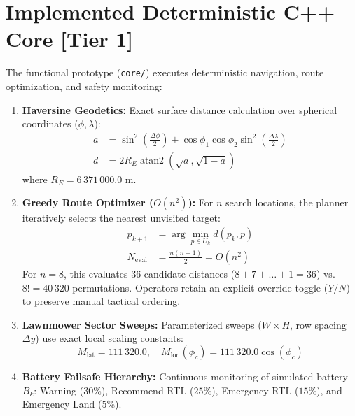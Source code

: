 \documentclass[conference]{IEEEtran}
\begin{document}
\section{Implemented Deterministic C++ Core [Tier 1]}
The functional prototype (\texttt{core/}) executes deterministic navigation, route optimization, and safety monitoring:
\begin{enumerate}
    \item \textbf{Haversine Geodetics:} Exact surface distance calculation over spherical coordinates ($\phi, \lambda$):
    \begin{align}
    a &= \sin^2\left(\frac{\Delta\phi}{2}\right) + \cos\phi_1\cos\phi_2\sin^2\left(\frac{\Delta\lambda}{2}\right) \\
    d &= 2 R_E \operatorname{atan2}\left(\sqrt{a}, \sqrt{1-a}\right)
    \end{align}
    where $R_E = 6\,371\,000.0\text{ m}$.
    
    \item \textbf{Greedy Route Optimizer ($O(n^2)$):} For $n$ search locations, the planner iteratively selects the nearest unvisited target:
    \begin{align}
    p_{k+1} &= \arg\min_{p \in U_k} d(p_k, p) \\
    N_{\mathrm{eval}} &= \frac{n(n+1)}{2} = O(n^2)
    \end{align}
    For $n=8$, this evaluates 36 candidate distances ($8+7+\dots+1=36$) vs.\ $8! = 40\,320$ permutations. Operators retain an explicit override toggle ($Y/N$) to preserve manual tactical ordering.
    
    \item \textbf{Lawnmower Sector Sweeps:} Parameterized sweeps ($W \times H$, row spacing $\Delta y$) use exact local scaling constants:
    \begin{equation}
    M_{\mathrm{lat}} = 111\,320.0, \quad M_{\mathrm{lon}}(\phi_c) = 111\,320.0 \cos(\phi_c)
    \end{equation}
    
    \item \textbf{Battery Failsafe Hierarchy:} Continuous monitoring of simulated battery $B_k$: Warning ($30\%$), Recommend RTL ($25\%$), Emergency RTL ($15\%$), and Emergency Land ($5\%$).
\end{enumerate}
\end{document}

